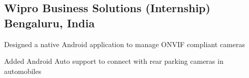 \documentclass[letter,10pt]{article}
\begin{document}

\subsection{Wipro Business Solutions (Internship) \hfill Bengaluru, India}
\begin{zitemize}
\item Designed a native Android application to manage ONVIF compliant cameras
\item Added Android Auto support to connect with rear parking cameras in automobiles
\end{zitemize}

\end{document}
